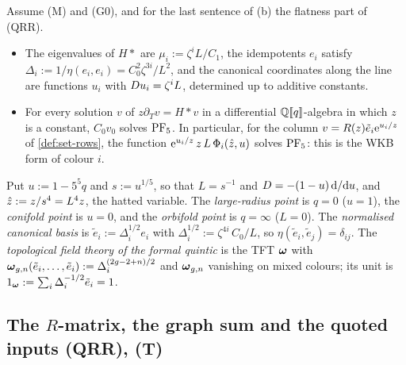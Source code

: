 \begin{cor}
\label{cor:set-cyclicPF5}
Assume (M) and (G0), and for the last sentence of (b) the flatness part of (QRR).
\begin{itemize}
\item[(a)] The eigenvalues of $H*$ are $\mu_i:=\zeta^iL/C_1$, the idempotents $e_i$ satisfy $\Delta_i:=1/\eta(e_i,e_i)=C_0^2\zeta^{3i}/L^2$, and the canonical coordinates along the line are functions $u_i$ with $D u_i=\zeta^iL$, determined up to additive constants.
\item[(b)] For every solution $v$ of $z\partial_Tv=H*v$ in a differential $\mathbb{Q}[\![ q ]\!]$-algebra in which $z$ is a constant, $C_0v_0$ solves $\mathrm{PF}_{5}$. In particular, for the column $v=R(z)\tilde e_i\mathrm{e}^{u_i/z}$ of \cref{def:set-rows}, the function $\mathrm{e}^{u_i/z}\,z\,L\,\Phi_i(\hat{z},u)$ solves $\mathrm{PF}_{5}$: this is the WKB form of colour $i$.
\end{itemize}
\end{cor}

\begin{defn}
\label{def:set-frob}
Put $u:=1-5^5q$ and $s:=u^{1/5}$, so that $L=s^{-1}$ and $D=-(1-u)\,\mathrm{d}/\mathrm{d} u$, and $\hat{z}:=z/s^4=L^4z$, the hatted variable. The \emph{large-radius point} is $q=0$ ($u=1$), the \emph{conifold point} is $u=0$, and the \emph{orbifold point} is $q=\infty$ ($L=0$). The \emph{normalised canonical basis} is $\tilde e_i:=\Delta_i^{1/2}e_i$ with $\Delta_i^{1/2}:=\zeta^{4i}\,C_0/L$, so $\eta(\tilde e_i,\tilde e_j)=\delta_{ij}$. The \emph{topological field theory of the formal quintic} is the TFT $\boldsymbol{\omega}$ with $\boldsymbol{\omega}_{g,n}(\tilde e_i,\dots,\tilde e_i):=\Delta_i^{(2g-2+n)/2}$ and $\boldsymbol{\omega}_{g,n}$ vanishing on mixed colours; its unit is $1_{\boldsymbol{\omega}}:=\sum_i\Delta_i^{-1/2}\tilde e_i=1$.
\end{defn}

\subsection{The \texorpdfstring{$R$}{R}-matrix, the graph sum and the quoted inputs (QRR), (T)}
\label{sec:set-rows}

